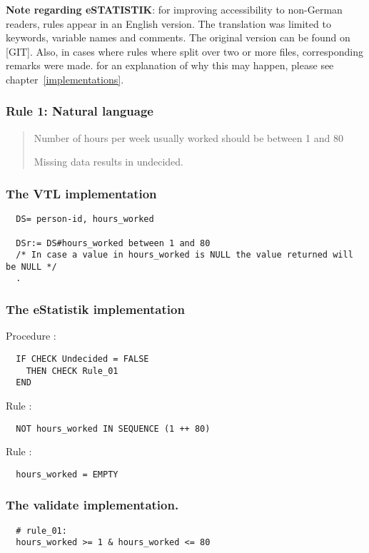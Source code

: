 \textbf{Note regarding eSTATISTIK}: for improving accessibility to non-German readers, rules appear in an English version. The translation was limited to keywords, variable names and comments. The original version can be found on [GIT]. Also, in cases where rules where split over two or more files, corresponding remarks were made. for an explanation of why this may happen, please see chapter~\ref{implementations}.

\subsubsection*{  Rule 1: Natural language}
\begin{quote}


Number of hours per week usually worked should be between 1 and 80

Missing data results in undecided.


\end{quote}
\subsubsection*{The VTL implementation}
\begin{verbatim}
  DS= person-id, hours_worked

  DSr:= DS#hours_worked between 1 and 80
  /* In case a value in hours_worked is NULL the value returned will be NULL */
  .
\end{verbatim}
\subsubsection*{The eStatistik implementation}

Procedure :

\begin{verbatim}
  IF CHECK Undecided = FALSE  
    THEN CHECK Rule_01
  END
\end{verbatim}

\noindent
Rule :

\begin{verbatim}
  NOT hours_worked IN SEQUENCE (1 ++ 80)
\end{verbatim}

\noindent
Rule :

\begin{verbatim}
  hours_worked = EMPTY
\end{verbatim}

\subsubsection*{The validate implementation.}
\begin{verbatim}
  # rule_01:
  hours_worked >= 1 & hours_worked <= 80
\end{verbatim}


